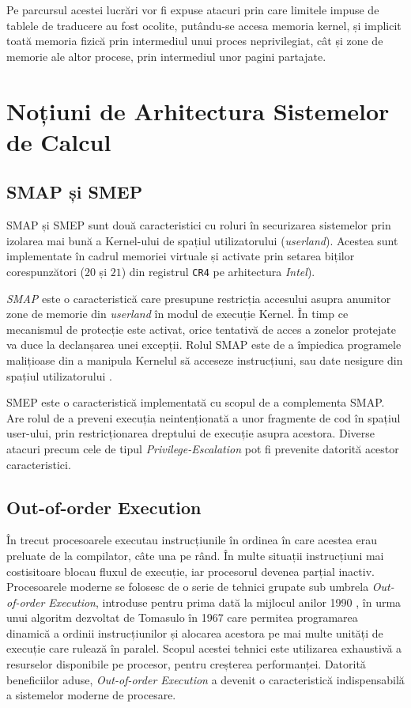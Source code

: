 Pe parcursul acestei lucrări vor fi expuse atacuri prin care limitele impuse de
tablele de traducere au fost ocolite, putându-se accesa memoria kernel, și
implicit toată memoria fizică prin intermediul unui proces neprivilegiat, cât și
zone de memorie ale altor procese, prin intermediul unor pagini partajate.

\section{Noțiuni de Arhitectura Sistemelor de Calcul} 

\subsection{SMAP și SMEP}

SMAP și SMEP sunt două caracteristici cu roluri în securizarea sistemelor prin
izolarea mai bună a Kernel-ului de spațiul utilizatorului (\emph{userland}).
Acestea sunt implementate în cadrul memoriei virtuale și activate prin setarea
biților corespunzători ($20$ și $21$) din registrul \texttt{CR4} pe arhitectura
\emph{Intel}).

\emph{SMAP} este o caracteristică care presupune restricția accesului asupra
anumitor zone de memorie din \emph{userland} în modul de execuție Kernel. În
timp ce mecanismul de protecție este activat, orice tentativă de acces a zonelor
protejate va duce la declanșarea unei excepții. Rolul SMAP este de a împiedica
programele malițioase din a manipula Kernelul să acceseze instrucțiuni, sau
date nesigure din spațiul utilizatorului \cite{smap}.

SMEP este o caracteristică implementată cu scopul de a complementa SMAP. Are
rolul de a preveni execuția neintenționată a unor fragmente de cod în spațiul 
user-ului, prin restricționarea dreptului de execuție asupra acestora. Diverse
atacuri precum cele de tipul \emph{Privilege-Escalation} pot fi prevenite 
datorită acestor caracteristici.

\subsection{Out-of-order Execution}
\label{sec:ooo_exec}

În trecut procesoarele executau instrucțiunile în ordinea în care acestea erau
preluate de la compilator, câte una pe rând. În multe situații instrucțiuni mai
costisitoare blocau fluxul de execuție, iar procesorul devenea parțial inactiv.
Procesoarele moderne se folosesc de o serie de tehnici grupate sub umbrela
\emph{Out-of-order Execution}, introduse pentru prima dată la mijlocul anilor
1990 \cite{what_is_speculative_execution}, în urma unui algoritm dezvoltat de 
Tomasulo în 1967 \cite{tomasulo1967} care permitea programarea dinamică
a ordinii instrucțiunilor și alocarea acestora pe mai multe unități de execuție
care rulează în paralel. Scopul acestei tehnici este utilizarea exhaustivă a
resurselor disponibile pe procesor, pentru creșterea performanței. Datorită
beneficiilor aduse, \emph{Out-of-order Execution} a devenit o caracteristică
indispensabilă a sistemelor moderne de procesare.

